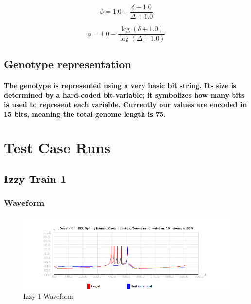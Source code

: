 \documentclass[titlepage,norsk]{article}
\begin{document}
\begin{equation}\label{fitness}
\phi = 1.0 - \frac{ \delta +1.0}{\Delta + 1.0}
\end{equation}


\begin{equation}\label{logfitness}
\phi = 1.0 - \frac{ \log{ ( \delta +1.0 ) } }{\log { ( \Delta + 1.0) } }
\end{equation}

\subsection{Genotype representation}
\paragraph{
The genotype is represented using a very basic bit string. Its size is determined by a hard-coded bit-variable; it symbolizes how many bits is used to represent each variable. Currently our values are encoded in 15 bits, meaning the total genome length is 75.
}
\section{Test Case Runs}

\subsection{Izzy Train 1}

\subsubsection{Waveform}

\begin{figure}[h!]
\centering
\includegraphics[scale=0.75]{izzy1wave.png}
\caption{Izzy 1 Waveform}
\label{fig:awesome_image}
\end{figure}
\end{document}

